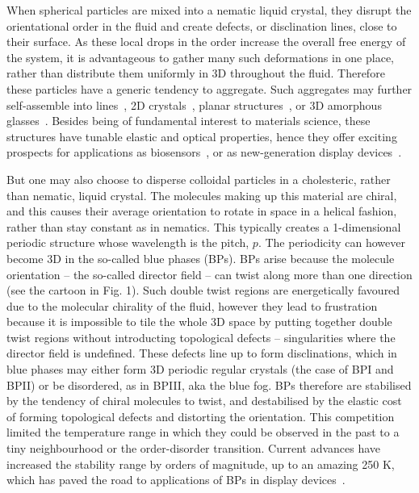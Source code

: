 \documentclass[12pt]{article}
\begin{document}

When spherical particles are mixed into a nematic liquid crystal, 
they disrupt the orientational order in the fluid and create defects,
or disclination lines, close to their surface. As these local drops in
the order increase the overall free energy of the system, it is advantageous
to gather many such deformations in one place, rather than distribute them 
uniformly in 3D throughout the fluid. Therefore these particles 
have a generic tendency to aggregate. Such aggregates may further 
self-assemble into lines~\cite{wiresmiha}, 2D crystals~\cite{zumer}, 
planar structures~\cite{tanaka}, or 3D amorphous glasses~\cite{tiffany}.
Besides being of fundamental interest to materials science, these
structures have tunable elastic and optical properties, hence 
they offer exciting prospects for applications as biosensors~\cite{abbott}, or
as new-generation display devices~\cite{colloiddevice}.

But one may also choose to disperse colloidal particles in a cholesteric, 
rather than nematic, liquid crystal. The molecules making up this material are
chiral, and this causes their average orientation to rotate in space in
a helical fashion, rather than stay constant as in nematics. 
This typically creates a 1-dimensional periodic structure whose wavelength 
is the pitch, $p$. The periodicity can however become 3D in the so-called 
blue phases (BPs). BPs arise because the molecule orientation -- the so-called 
director field -- can twist along more than one direction (see 
the cartoon in Fig. 1). Such double twist 
regions are energetically favoured due to the molecular chirality of the fluid,
however they lead to frustration because it is impossible to tile the whole 3D
space by putting together double twist regions without introducting
topological defects -- singularities where the director field is undefined.
These defects line up to form disclinations, which in blue phases may
either form 3D periodic regular crystals (the case of BPI and BPII) or be 
disordered, as in BPIII, aka the blue fog. BPs therefore are stabilised by
the tendency of chiral molecules to twist, and destabilised by the
elastic cost of forming topological defects and distorting the orientation.
This competition limited the temperature range in which they could be
observed in the past to a tiny neighbourhood or the order-disorder
transition. Current advances have increased the stability range by orders
of magnitude, up to an amazing 250 K, which has paved the road to
applications of BPs in display devices~\cite{kikuchi,coleswidetrange,bpdevice}.
\end{document}

